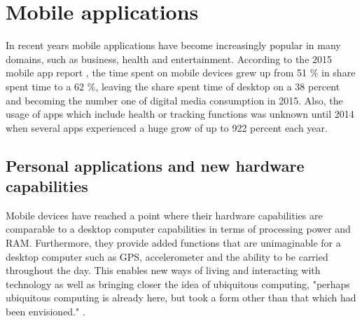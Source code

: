 \section{Mobile applications}
In recent years mobile applications have become increasingly popular in many domains, such as business, health and entertainment. According to the 2015 mobile app report \cite{ComScore}, the time spent on mobile devices grew up from 51 \% in share spent time to a 62 \%, leaving the share spent time of desktop on a 38 percent and becoming the number one of digital media consumption in 2015. Also, the usage of apps which include health or tracking functions was unknown until 2014 when several apps experienced a huge grow of up to 922 percent each year\cite{ComScore}. 

\subsection{Personal applications and new hardware capabilities}

Mobile devices have reached a point where their hardware capabilities are comparable to a desktop computer capabilities in terms of processing power and RAM. Furthermore, they provide added functions that are unimaginable for a desktop computer such as GPS, accelerometer and the ability to be carried throughout the day. This enables new ways of living and interacting with technology as well as bringing closer the idea of ubiquitous computing, "perhaps ubiquitous computing is already here, but took a form other than that which had been envisioned." \cite{Bell2007}. 

